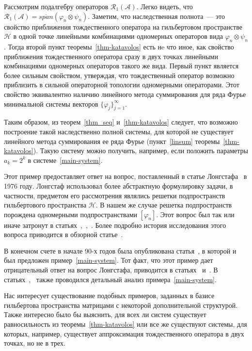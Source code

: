 \documentclass[a4paper,12pt]{article}
\newcommand{\cspan}[1]{\overline{span}\left(#1\right)}
\renewcommand{\cal}[1]{\mathcal{#1}}
\renewcommand{\phi}{\varphi}
\numberwithin{prop_under_lemma}{lemma}
\begin{document}
Рассмотрим подалгебру операторов $\cal{R}_1(\cal{A})$.
Легко видеть, что $\cal{R}_1(\cal{A})=\cspan{\phi_n \otimes \psi_n}$.
Заметим, что наследственная полнота~--- это свойство приближения тождественного оператора на гильбертовом пространстве $\cal{H}$ в одной точке 
  линейными комбинациями одномерных операторов вида $\phi_n \otimes \psi_n$.
Тогда второй пункт теоремы~\ref{thm-katavolos} есть нe что иное, как свойство приближения тождественного оператора сразу в двух точках 
  линейными комбинациями одномерных операторов такого же вида.
Первый пункт является более сильным свойством, утверждая, что тождественный оператор возможно приблизить в сильной операторной топологии одномерными операторами.
Этот свойство эквивалентно наличию линейного метода суммирования для ряда Фурье минимальной системы векторов $\{\phi_j\}_{j=1}^\infty$.

Таким образом, из теорем~\ref{thm_seq} и~\ref{thm-katavolos} следует, что возможно построение такой наследственно полной системы,
  для которой не существует линейного метода суммирования ее ряда Фурье (пункт~\ref{linsum} теоремы~\ref{thm-katavolos}).
Такую систему можно получить, например, если положить параметры $a_k = 2^k$ в системе~\eqref{main-system}.

Этот пример предоставляет ответ на вопрос, поставленный в статье Лонгстафа~\cite{longstaff} в 1976 году.
Лонгстаф использовал более абстрактную формулировку задачи, в частности, предметом его рассмотрения являлись решетки подпространств гильбертового пространства $\cal{H}$.
В нашем же случае решетка подпространств порождена одномерными подпространствами $[\phi_n]$.
Этот вопрос был так или иначе затронут в статьях~\cite{erdos},~\cite{longstaff},~\cite{laurielongstaff}.
Более подробно история исследования этого вопроса приводится в обзорной статье~\cite{review}.

В конечном счете в начале 90-х годов была опубликована статья~\cite{larson}, в которой и был предложен пример~\eqref{main-system}.
Тот факт, что этот пример дает отрицательный ответ на вопрос Лонгстафа, приводится в статьях~\cite{argyroslambrou} и~\cite{larson}.
В статьях~\cite{azoff},~\cite{katavolos} также проводился детальный анализ примера~\eqref{main-system}.

Нас интересует существование подобных примеров, заданных в базисе гильбертова пространства матрицами с некоторой дополнительной структурой.
Также интересно было бы выяснить, для всех ли систем существует равносильность из теоремы~\ref{thm-katavolos} или 
  все же существуют системы, для которых, например, существует аппроксимация тождественного оператора в двух точках, но не в трех.
\end{document}
